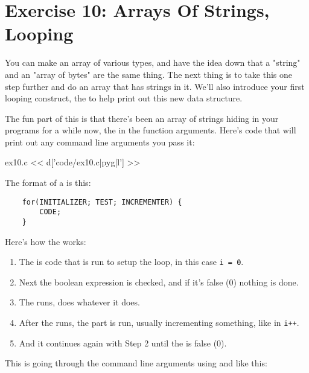 \chapter{Exercise 10: Arrays Of Strings, Looping}

You can make an array of various types, and have the idea down that a
"string" and an "array of bytes" are the same thing.  The next thing is
to take this one step further and do an array that has strings in it.
We'll also introduce your first looping construct, the 
to help print out this new data structure.

The fun part of this is that there's been an array of strings hiding in
your programs for a while now, the  in the 
function arguments.  Here's code that will print out any command line
arguments you pass it:

\begin{code}{ex10.c}
<< d['code/ex10.c|pyg|l'] >>
\end{code}

The format of a  is this:

\begin{Verbatim}
    for(INITIALIZER; TEST; INCREMENTER) {
        CODE;
    }
\end{Verbatim}

Here's how the  works:

\begin{enumerate}
\item The  is code that is run to setup the loop, in this
    case \verb|i = 0|.
\item Next the  boolean expression is checked, and if it's false (0)
    nothing is done.
\item The  runs, does whatever it does.
\item After the  runs, the  part is run, usually
    incrementing something, like in \verb|i++|.
\item And it continues again with Step 2 until the  is false (0).
\end{enumerate}

This  is going through the command line arguments 
using  and  like this:

